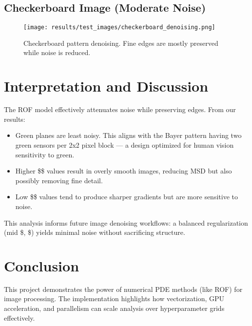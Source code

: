 \documentclass[11pt]{article}
\begin{document}
\subsection{Checkerboard Image (Moderate Noise)}
\begin{figure}[h!]
\centering
\texttt{[image: results/test\_images/checkerboard\_denoising.png]}
\caption{Checkerboard pattern denoising. Fine edges are mostly preserved while noise is reduced.}
\end{figure}

\section{Interpretation and Discussion}
The ROF model effectively attenuates noise while preserving edges. From our results:

\begin{itemize}
\item Green planes are least noisy. This aligns with the Bayer pattern having two green sensors per 2x2 pixel block — a design optimized for human vision sensitivity to green.
\item Higher \$\lambda\$ values result in overly smooth images, reducing MSD but also possibly removing fine detail.
\item Low \$\epsilon\$ values tend to produce sharper gradients but are more sensitive to noise.
\end{itemize}

This analysis informs future image denoising workflows: a balanced regularization (mid \$\lambda, \epsilon\$) yields minimal noise without sacrificing structure.

\section{Conclusion}
This project demonstrates the power of numerical PDE methods (like ROF) for image processing. The implementation highlights how vectorization, GPU acceleration, and parallelism can scale analysis over hyperparameter grids effectively.
\end{document}
